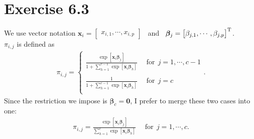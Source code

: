 \section*{Exercise 6.3}
We use vector notation
$\bm{x}_{i} =
\begin{bmatrix}
x_{i,1}, \cdots, x_{i,p}
\end{bmatrix}$
~and~
$\bm{\beta}_{j} =
\begin{bmatrix}
\beta_{j,1}, \cdots, \beta_{j,p}
\end{bmatrix}^{\rm T}$.\\

$\pi_{i,j}$ is defined as
\begin{align*}
\pi_{i,j} =
\begin{cases}
\frac{\exp\left[\bm{x}_{i}\bm{\beta}_{j}\right]}{1+\sum_{h=1}^{c-1}\exp\left[\bm{x}_{i}\bm{\beta}_{h}\right]} ~~&\mbox{for}~~ j = 1, \cdots, c-1\\
\\
\frac{1}{1+\sum_{h=1}^{c-1}\exp\left[\bm{x}_{i}\bm{\beta}_{h}\right]} ~~&\mbox{for}~~ j = c\\
\end{cases}.
\end{align*}
Since the restriction we impose is $\bm{\beta}_{c} = \bm{0}$, I prefer to merge these two cases into one: 
\begin{align*}
\pi_{i,j} =
\frac{\exp\left[\bm{x}_{i}\bm{\beta}_{j}\right]}{\sum_{h=1}^{c}\exp\left[\bm{x}_{i}\bm{\beta}_{h}\right]} ~~&\mbox{for}~~ j = 1, \cdots, c.
\end{align*}


